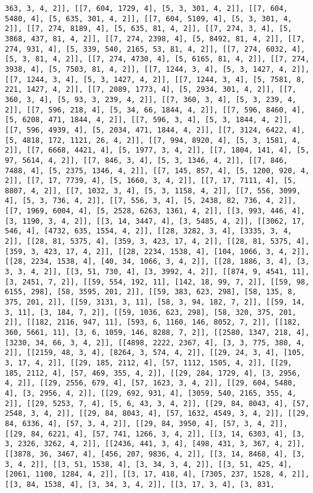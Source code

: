 \documentclass[12pt,fleqn]{article}\usepackage{../../common}
\begin{document}
\begin{verbatim}
363, 3, 4, 2]], [[7, 604, 1729, 4], [5, 3, 301, 4, 2]], [[7, 604, 5480, 4], [5, 635, 301, 4, 2]], [[7, 604, 5109, 4], [5, 3, 301, 4, 2]], [[7, 274, 8189, 4], [5, 635, 81, 4, 2]], [[7, 274, 3, 4], [5, 3868, 437, 81, 4, 2]], [[7, 274, 2398, 4], [5, 8492, 81, 4, 2]], [[7, 274, 931, 4], [5, 339, 540, 2165, 53, 81, 4, 2]], [[7, 274, 6032, 4], [5, 3, 81, 4, 2]], [[7, 274, 4730, 4], [5, 6165, 81, 4, 2]], [[7, 274, 3938, 4], [5, 7503, 81, 4, 2]], [[7, 1244, 3, 4], [5, 3, 1427, 4, 2]], [[7, 1244, 3, 4], [5, 3, 1427, 4, 2]], [[7, 1244, 3, 4], [5, 7581, 8, 221, 1427, 4, 2]], [[7, 2089, 1773, 4], [5, 2934, 301, 4, 2]], [[7, 360, 3, 4], [5, 93, 3, 239, 4, 2]], [[7, 360, 3, 4], [5, 3, 239, 4, 2]], [[7, 596, 218, 4], [5, 34, 66, 1844, 4, 2]], [[7, 596, 8460, 4], [5, 6208, 471, 1844, 4, 2]], [[7, 596, 3, 4], [5, 3, 1844, 4, 2]], [[7, 596, 4939, 4], [5, 2034, 471, 1844, 4, 2]], [[7, 3124, 6422, 4], [5, 4818, 172, 1121, 26, 4, 2]], [[7, 994, 8920, 4], [5, 3, 1581, 4, 2]], [[7, 6668, 4421, 4], [5, 1977, 3, 4, 2]], [[7, 1804, 141, 4], [5, 97, 5614, 4, 2]], [[7, 846, 3, 4], [5, 3, 1346, 4, 2]], [[7, 846, 7488, 4], [5, 2375, 1346, 4, 2]], [[7, 145, 857, 4], [5, 1200, 920, 4, 2]], [[7, 17, 7739, 4], [5, 1660, 3, 4, 2]], [[7, 17, 7111, 4], [5, 8807, 4, 2]], [[7, 1032, 3, 4], [5, 3, 1158, 4, 2]], [[7, 556, 3099, 4], [5, 3, 736, 4, 2]], [[7, 556, 3, 4], [5, 2438, 82, 736, 4, 2]], [[7, 1969, 6004, 4], [5, 2528, 6263, 1361, 4, 2]], [[3, 993, 446, 4], [3, 1190, 3, 4, 2]], [[3, 14, 3447, 4], [3, 5485, 4, 2]], [[3062, 17, 546, 4], [4732, 635, 1554, 4, 2]], [[28, 3282, 3, 4], [3335, 3, 4, 2]], [[28, 81, 5375, 4], [359, 3, 423, 17, 4, 2]], [[28, 81, 5375, 4], [359, 3, 423, 17, 4, 2]], [[28, 2234, 1538, 4], [104, 1066, 3, 4, 2]], [[28, 2234, 1538, 4], [40, 34, 1066, 3, 4, 2]], [[28, 1886, 3, 4], [3, 3, 3, 4, 2]], [[3, 51, 730, 4], [3, 3992, 4, 2]], [[874, 9, 4541, 11], [3, 2451, 7, 2]], [[59, 554, 192, 11], [142, 18, 99, 7, 2]], [[59, 98, 6155, 298], [58, 3595, 201, 2]], [[59, 383, 623, 298], [58, 135, 8, 375, 201, 2]], [[59, 3131, 3, 11], [58, 3, 94, 182, 7, 2]], [[59, 14, 3, 11], [3, 184, 7, 2]], [[59, 1036, 623, 298], [58, 320, 375, 201, 2]], [[182, 2116, 947, 11], [593, 6, 1160, 146, 8052, 7, 2]], [[182, 360, 5661, 11], [3, 6, 1059, 146, 8288, 7, 2]], [[2580, 1347, 218, 4], [3230, 34, 66, 3, 4, 2]], [[4898, 2222, 2367, 4], [3, 3, 775, 380, 4, 2]], [[2159, 48, 3, 4], [8264, 3, 574, 4, 2]], [[29, 24, 3, 4], [105, 3, 17, 4, 2]], [[29, 185, 2112, 4], [57, 1112, 1505, 4, 2]], [[29, 185, 2112, 4], [57, 469, 355, 4, 2]], [[29, 284, 1729, 4], [3, 2956, 4, 2]], [[29, 2556, 679, 4], [57, 1623, 3, 4, 2]], [[29, 604, 5480, 4], [3, 2956, 4, 2]], [[29, 692, 931, 4], [3059, 540, 2165, 355, 4, 2]], [[29, 5253, 7, 4], [5, 6, 43, 3, 4, 2]], [[29, 84, 8043, 4], [57, 2548, 3, 4, 2]], [[29, 84, 8043, 4], [57, 1632, 4549, 3, 4, 2]], [[29, 84, 6336, 4], [57, 3, 4, 2]], [[29, 84, 3950, 4], [57, 3, 4, 2]], [[29, 84, 6221, 4], [57, 741, 1266, 3, 4, 2]], [[3, 14, 6303, 4], [3, 3, 2326, 3262, 4, 2]], [[2436, 441, 3, 4], [498, 431, 3, 367, 4, 2]], [[3878, 36, 3467, 4], [456, 207, 9836, 4, 2]], [[3, 14, 8468, 4], [3, 3, 4, 2]], [[3, 51, 1538, 4], [3, 34, 3, 4, 2]], [[3, 51, 425, 4], [2061, 1100, 1284, 4, 2]], [[3, 17, 418, 4], [7305, 237, 1528, 4, 2]], [[3, 84, 1538, 4], [3, 34, 3, 4, 2]], [[3, 17, 3, 4], [3, 831, 
\end{verbatim}
\end{document}
